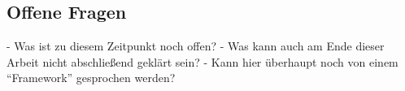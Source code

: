 
\subsection{Offene Fragen} %
\label{sub:offene_fragen}

  - Was ist zu diesem Zeitpunkt noch offen?
  - Was kann auch am Ende dieser Arbeit nicht abschließend geklärt sein?
  - Kann hier überhaupt noch von einem "`Framework"' gesprochen werden?




